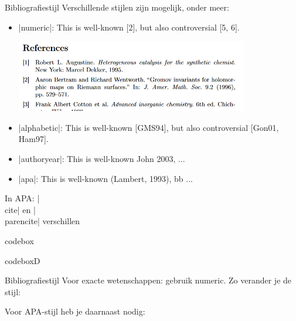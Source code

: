 
\begin{frame}{Bibliografiestijl}
	Verschillende stijlen zijn mogelijk, onder meer:
	
	\begin{itemize}
		\item \hll|numeric|: This is well-known [2], but also controversial [5, 6].\par
		\includegraphics[width=0.8\textwidth]{assets/biblatexStyles/numericReferences.png}
		
		\item\hll|alphabetic|: This is well-known [GMS94], but also controversial [Gon01, Ham97].
		\item\hll|authoryear|: This is well-known John 2003, ...
		\item\hll|apa|: This is well-known (Lambert, 1993), bb ...
	\end{itemize}
	In APA: \hll|\\cite| en \hll|\\parencite| verschillen
\end{frame}


\begin{saveblock}{codebox}
	\begin{highlightblock}
		\usepackage[style=numeric]{biblatex}
	\end{highlightblock}
\end{saveblock}


\begin{saveblock}{codeboxD}%
	\begin{highlightblock}
	\end{highlightblock}
\end{saveblock}

\begin{frame}{Bibliografiestijl}
	Voor exacte wetenschappen: gebruik numeric. Zo
	verander je de stijl:
	
	\medskip
	Voor APA-stijl heb je daarnaast nodig:
\end{frame}
